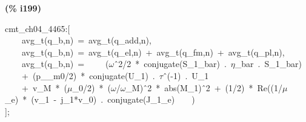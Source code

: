 \documentclass[fleqn]{article}
\begin{document}
\noindent
\begin{minipage}[t]{4.000000em}\color{red}\bfseries
(\% i199)	
\end{minipage}
\begin{minipage}[t]{\textwidth}\color{blue}
cmt\_ch04\_4465:[\ \\
\ \ \ \ avg\_t(q\_b,n)\ =\ avg\_t(q\_add,n),\ \\
\ \ \ \ avg\_t(q\_b,n)\ =\ avg\_t(q\_el,n)\ +\ avg\_t(q\_fm,n)\ +\ avg\_t(q\_pl,n),\\
\ \ \ \ avg\_t(q\_b,n)\ =\ \ \ \ \ (\ensuremath{\omega}\^\ 2/2\ *\ conjugate(S\_1\_bar)\ .\ \ensuremath{\eta}\_bar\ .\ S\_1\_bar)\\
\ \ \ \ +\ (p\_\_m0/2)\ *\ conjugate(U\_1)\ .\ \ensuremath{\tau}\^\ (-1)\ .\ U\_1\\
\ \ \ \ +\ v\_M\ *\ (\ensuremath{\mu}\_0/2)\ *\ (\ensuremath{\omega}/\ensuremath{\omega}\_M)\^\ 2\ *\ abs(M\_1)\^\ 2\ +\ (1/2)\ *\ Re((1/\ensuremath{\mu}\_e)\ *\ (v\_1\ -\ j\_1*v\_0)\ .\ conjugate(J\_1\_e)\ \ \ \ )\\
];
\end{minipage}
\end{document}
